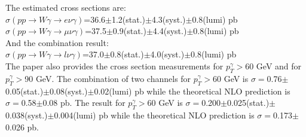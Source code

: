 The estimated cross sections are:\\
$\sigma(pp\rightarrow W\gamma \rightarrow e\nu\gamma)$=36.6$\pm$1.2(stat.)$\pm$4.3(syst.)$\pm$0.8(lumi) pb\\
$\sigma(pp\rightarrow W\gamma \rightarrow \mu\nu\gamma)$=37.5$\pm$0.9(stat.)$\pm$4.4(syst.)$\pm$0.8(lumi) pb\\
And the combination result:\\
$\sigma(pp\rightarrow W\gamma \rightarrow l\nu\gamma)$=37.0$\pm$0.8(stat.)$\pm$4.0(syst.)$\pm$0.8(lumi) pb\\

The paper also provides the cross section measurements for $p_T^\gamma>$60 GeV and for $p_T^\gamma>$90 GeV. The combination of two channels for $p_T^\gamma>$60 GeV is $\sigma=$0.76$\pm$0.05(stat.)$\pm$0.08(syst.)$\pm$0.02(lumi) pb while the theoretical NLO prediction is $\sigma=$0.58$\pm$0.08 pb. The result for $p_T^\gamma>$60 GeV is $\sigma=$0.200$\pm$0.025(stat.)$\pm$0.038(syst.)$\pm$0.004(lumi) pb while the theoretical NLO prediction is $\sigma=$0.173$\pm$0.026 pb.\\







